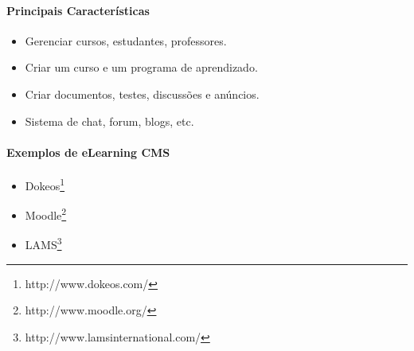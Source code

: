 \paragraph{Principais Características}

\begin{itemize}
  \item Gerenciar cursos, estudantes, professores.
  \item Criar um curso e um programa de aprendizado.
  \item Criar documentos, testes, discussões e anúncios.
  \item Sistema de chat, forum, blogs, etc.
\end{itemize}

\paragraph{Exemplos de eLearning CMS} 

\begin{itemize}
  \item Dokeos\footnote{http://www.dokeos.com/}
  \item Moodle\footnote{http://www.moodle.org/}
  \item LAMS\footnote{http://www.lamsinternational.com/}
\end{itemize}


